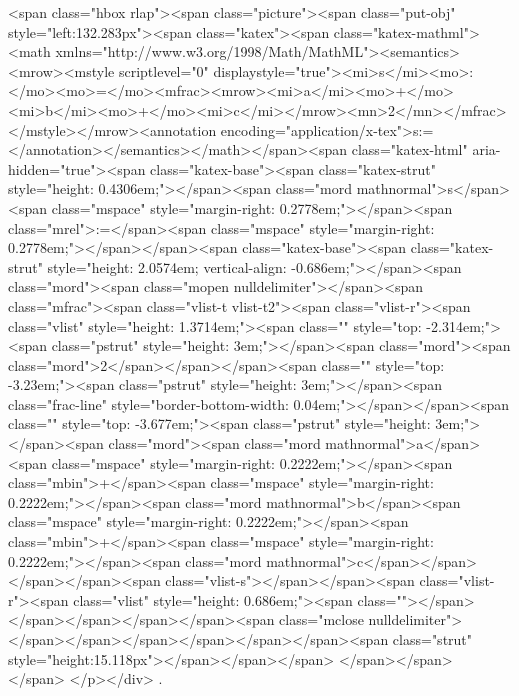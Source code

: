<span class="hbox rlap"><span class="picture"><span class="put-obj" style="left:132.283px"><span class="katex"><span class="katex-mathml"><math xmlns="http://www.w3.org/1998/Math/MathML"><semantics><mrow><mstyle scriptlevel="0" displaystyle="true"><mi>s</mi><mo>:</mo><mo>=</mo><mfrac><mrow><mi>a</mi><mo>+</mo><mi>b</mi><mo>+</mo><mi>c</mi></mrow><mn>2</mn></mfrac></mstyle></mrow><annotation encoding="application/x-tex">\displaystyle s:=</annotation></semantics></math></span><span class="katex-html" aria-hidden="true"><span class="katex-base"><span class="katex-strut" style="height: 0.4306em;"></span><span class="mord mathnormal">s</span><span class="mspace" style="margin-right: 0.2778em;"></span><span class="mrel">:=</span><span class="mspace" style="margin-right: 0.2778em;"></span></span><span class="katex-base"><span class="katex-strut" style="height: 2.0574em; vertical-align: -0.686em;"></span><span class="mord"><span class="mopen nulldelimiter"></span><span class="mfrac"><span class="vlist-t vlist-t2"><span class="vlist-r"><span class="vlist" style="height: 1.3714em;"><span class="" style="top: -2.314em;"><span class="pstrut" style="height: 3em;"></span><span class="mord"><span class="mord">2</span></span></span><span class="" style="top: -3.23em;"><span class="pstrut" style="height: 3em;"></span><span class="frac-line" style="border-bottom-width: 0.04em;"></span></span><span class="" style="top: -3.677em;"><span class="pstrut" style="height: 3em;"></span><span class="mord"><span class="mord mathnormal">a</span><span class="mspace" style="margin-right: 0.2222em;"></span><span class="mbin">+</span><span class="mspace" style="margin-right: 0.2222em;"></span><span class="mord mathnormal">b</span><span class="mspace" style="margin-right: 0.2222em;"></span><span class="mbin">+</span><span class="mspace" style="margin-right: 0.2222em;"></span><span class="mord mathnormal">c</span></span></span></span><span class="vlist-s">​</span></span><span class="vlist-r"><span class="vlist" style="height: 0.686em;"><span class=""></span></span></span></span></span><span class="mclose nulldelimiter"></span></span></span></span></span></span><span class="strut" style="height:15.118px"></span></span></span>
</span></span>​ </span>
</p></div>
.